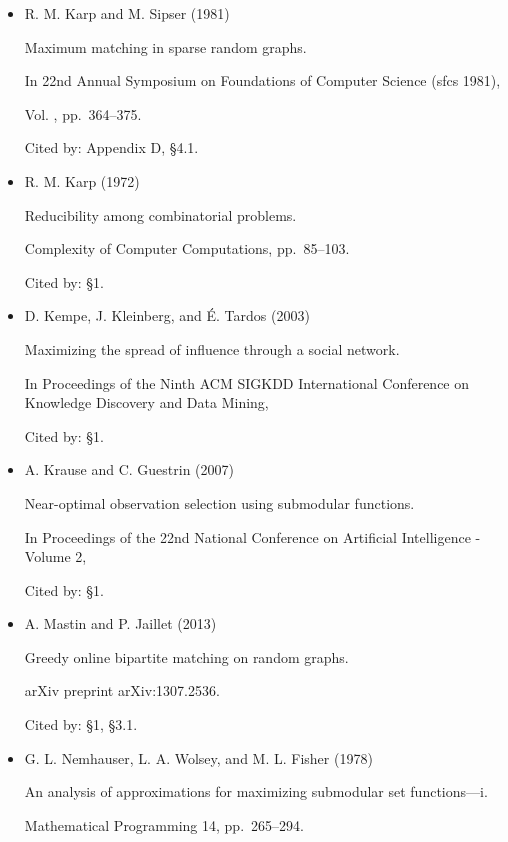 \begin{itemize}
Cited by: §1.



\item[] [16]
R. M. Karp and M. Sipser (1981)

Maximum matching in sparse random graphs.

In 22nd Annual Symposium on Foundations of Computer Science (sfcs 1981),

Vol. , pp. 364–375.

Cited by: Appendix D,
§4.1.



\item[] [17]
R. M. Karp (1972)

Reducibility among combinatorial problems.

Complexity of Computer Computations, pp. 85–103.

Cited by: §1.



\item[] [18]
D. Kempe, J. Kleinberg, and É. Tardos (2003)

Maximizing the spread of influence through a social network.

In Proceedings of the Ninth ACM SIGKDD International Conference on Knowledge Discovery and Data Mining,

Cited by: §1.



\item[] [19]
A. Krause and C. Guestrin (2007)

Near-optimal observation selection using submodular functions.

In Proceedings of the 22nd National Conference on Artificial Intelligence - Volume 2,

Cited by: §1.



\item[] [20]
A. Mastin and P. Jaillet (2013)

Greedy online bipartite matching on random graphs.

arXiv preprint arXiv:1307.2536.

Cited by: §1,
§3.1.



\item[] [21]
G. L. Nemhauser, L. A. Wolsey, and M. L. Fisher (1978)

An analysis of approximations for maximizing submodular set functions—i.

Mathematical Programming 14, pp. 265–294.


\end{itemize}
